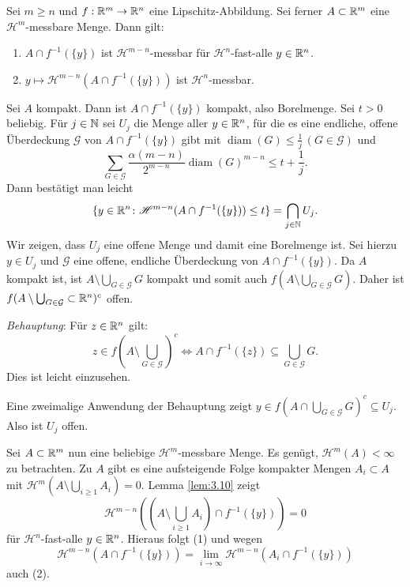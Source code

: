 \documentclass[a4paper,twoside,DIV15,BCOR12mm]{scrbook}
\newcommand{\HM}{\mathscr H}
\DeclareMathOperator{\diam}{diam}
\begin{document}
\begin{lemma}\label{lem:3.11}
Sei \(m\geq n\) und \(f:\mathbb{R}^m\to\mathbb{R}^n\) eine Lipschitz-Abbildung. Sei ferner \(A \subset \mathbb{R}^m\) eine \(\HM^m\)-messbare Menge. Dann gilt:
\begin{enumerate}[(1)]
\item \(A\cap f^{-1}(\{y\})\) ist \(\HM^{m-n}\)-messbar für \(\HM^n\)-fast-alle \(y \in \mathbb{R}^n\).
\item \(y\mapsto\HM^{m-n}(A\cap f^{-1}(\{y\}))\) ist \(\HM^n\)-messbar.
\end{enumerate}
\end{lemma}
\begin{beweis}
Sei \(A\) kompakt. Dann ist \(A\cap f^{-1}(\{y\})\) kompakt, also Borelmenge. Sei \(t>0\) beliebig. Für \(j \in \mathbb{N}\) sei \(U_j\) die Menge aller \(y\in\mathbb{R}^n\), für die es eine endliche, offene Überdeckung \(\mathcal G\) von \(A \cap f^{-1}(\{y\})\) gibt mit \(\diam(G) \leq \frac1j \, (G \in \mathcal G)\) und 
$$
\sum_{G\in \mathcal G} \frac{\alpha(m-n)}{2^{m-n}} \diam(G)^{m-n} \leq t + \frac1j.
$$ 
Dann bestätigt man leicht
\[
\{y\in\MdR^n \colon \HM^{m-n}(A\cap f^{-1}(\{y\})) \leq t\} = \bigcap_{j\in\MdN} U_j.
\]
Wir zeigen, dass \(U_j\) eine offene Menge und damit eine Borelmenge ist. Sei hierzu \(y\in U_j\) und  \(\mathcal G\) eine offene, endliche Überdeckung von \(A \cap f^{-1}(\{y\})\). Da \(A\) kompakt ist, ist \(A \setminus \bigcup_{G \in \mathcal G} G\) kompakt und somit auch \(f(A\setminus \bigcup_{G\in\mathcal G} G)\). Daher ist \(f(A \setminus \bigcup_{G\in\mathcal G} \subset \mathbb{R}^n)^c\) offen.
\par
\emph{Behauptung}: Für \(z \in \mathbb{R}^n\) gilt: 
$$
z \in f(A \setminus \bigcup_{G\in\mathcal G})^c \Leftrightarrow A \cap f^{-1}(\{z\}) \subseteq \bigcup_{G\in\mathcal G} G.
$$ 
Dies ist leicht einzusehen. 


Eine zweimalige Anwendung der Behauptung zeigt 
\(y\in f(A \cap \bigcup_{G\in\mathcal G} G)^c \subseteq U_j\). Also ist \(U_j\) offen.
\par
Sei \(A \subset \mathbb{R}^m\) nun eine beliebige \(\HM^m\)-messbare Menge. Es genügt, \(\HM^m(A)<\infty\) zu betrachten. Zu $A$ gibt es eine aufsteigende Folge kompakter Mengen \( A_i  \subset A\) mit \(\HM^m(A \setminus \bigcup_{i\geq1}A_i)=0\). Lemma \ref{lem:3.10} zeigt 
\[
\HM^{m-n}((A\setminus\bigcup_{i\geq1}A_i)\cap f^{-1}(\{y\})) = 0
\]
für \(\HM^n\)-fast-alle \(y\in\mathbb{R}^n\). Hieraus folgt (1) und wegen 
$$
\HM^{m-n}(A\cap f^{-1}(\{y\})) = \lim_{i\to\infty} \HM^{m-n}(A_i\cap f^{-1}(\{y\}))
$$ 
auch (2).
\end{beweis}
\end{document}
